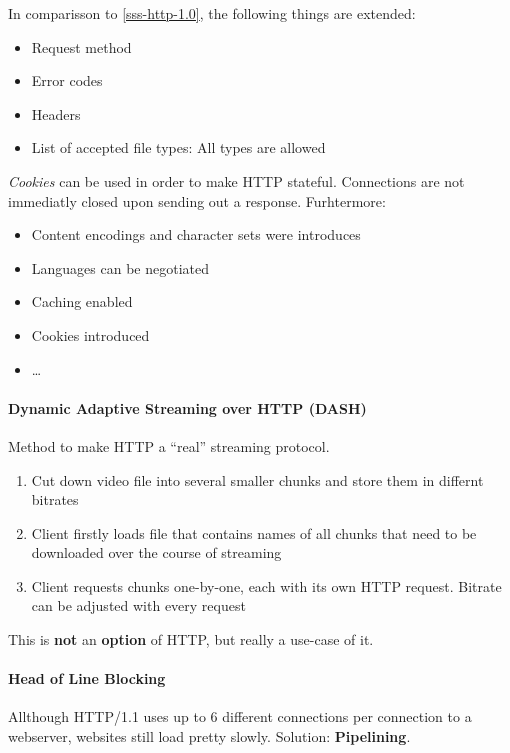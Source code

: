 \documentclass[english]{panikzettel}
\begin{document}
	In comparisson to \cref{sss-http-1.0}, the following things are extended:
	\begin{itemize}
		\item Request method
		\item Error codes
		\item Headers
		\item List of accepted file types: All types are allowed
	\end{itemize}

	\textit{Cookies} can be used in order to make HTTP stateful.
	Connections are not immediatly closed upon sending out a response. 
	Furhtermore:
	\begin{itemize}
		\item Content encodings and character sets were introduces
		\item Languages can be negotiated
		\item Caching enabled
		\item Cookies introduced
		\item \dots
	\end{itemize}

	\paragraph{Dynamic Adaptive Streaming over HTTP (DASH)}
	\label{pgf-dynamic-adaptive-streaming-over-http}
	
	Method to make HTTP a \enquote{real} streaming protocol.

	\begin{enumerate}
		\item Cut down video file into several smaller chunks and store them in differnt bitrates
		\item Client firstly loads file that contains names of all chunks that need to be downloaded over the course of streaming
		\item Client requests chunks one-by-one, each with its own HTTP request. Bitrate can be adjusted with every request
	\end{enumerate}

	This is \textbf{not} an \textbf{option} of HTTP, but really a use-case of it.

	\paragraph{Head of Line Blocking}
	\label{pgf-head-of-line-blocking}
	
	Allthough HTTP/1.1 uses up to 6 different connections per connection to a webserver, websites still load pretty slowly. Solution: \textbf{Pipelining}. 
\end{document}
